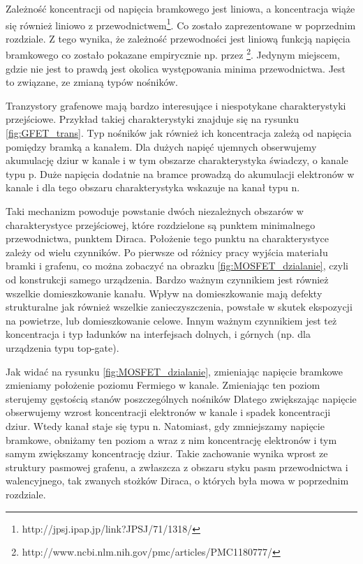 	
	Zależność koncentracji od napięcia bramkowego jest liniowa, a koncentracja wiąże się również liniowo z 
	przewodnictwem\footnote{http://jpsj.ipap.jp/link?JPSJ/71/1318/}. Co zostało zaprezentowane w poprzednim rozdziale.
	 Z tego wynika, że zależność przewodności jest liniową funkcją napięcia bramkowego co zostało pokazane empirycznie
	np. przez \footnote{http://www.ncbi.nlm.nih.gov/pmc/articles/PMC1180777/}.
	Jedynym miejscem, gdzie nie jest to prawdą jest okolica występowania minima przewodnictwa. Jest to związane, ze 
	zmianą typów nośników. 

	
	Tranzystory grafenowe mają bardzo interesujące i niespotykane charakterystyki przejściowe. Przykład takiej 
	charakterystyki znajduje się na rysunku \ref{fig:GFET_trans}. Typ nośników jak również ich koncentracja
	zależą od napięcia pomiędzy bramką a kanałem. Dla dużych napięć ujemnych obserwujemy akumulację dziur w kanale
	i w tym obszarze charakterystyka świadczy, o kanale typu p. Duże napięcia dodatnie na bramce prowadzą do akumulacji
	elektronów w kanale i dla tego obszaru charakterystyka wskazuje na kanał typu n.
	
	Taki mechanizm powoduje powstanie dwóch niezależnych obszarów w charakterystyce przejściowej, które rozdzielone są
	punktem minimalnego przewodnictwa, punktem Diraca. Położenie tego punktu na charakterystyce zależy od wielu 
	czynników. Po pierwsze od różnicy pracy wyjścia materiału bramki i grafenu, co można zobaczyć na obrazku 
	\ref{fig:MOSFET_dzialanie}, czyli od konstrukcji samego urządzenia. Bardzo ważnym czynnikiem jest również 
	wszelkie domieszkowanie kanału. Wpływ na domieszkowanie mają defekty strukturalne jak również wszelkie 
	zanieczyszczenia, powstałe w skutek ekspozycji na powietrze, lub domieszkowanie celowe. Innym ważnym czynnikiem 
	jest też koncentracja i typ ładunków na interfejsach dolnych, i górnych (np. dla urządzenia typu top-gate).
	


	Jak widać na rysunku \ref{fig:MOSFET_dzialanie}, zmieniając napięcie bramkowe zmieniamy położenie 
	poziomu Fermiego w kanale. Zmieniając ten poziom sterujemy gęstością stanów poszczególnych nośników 
	Dlatego zwiększając napięcie obserwujemy wzrost koncentracji elektronów w kanale i spadek koncentracji dziur.
	Wtedy kanał staje się typu n. Natomiast, gdy zmniejszamy napięcie bramkowe, obniżamy ten poziom a wraz z nim
	koncentrację elektronów i tym samym zwiększamy koncentrację dziur. Takie zachowanie wynika wprost ze struktury
	pasmowej grafenu, a zwłaszcza z obszaru styku pasm przewodnictwa i walencyjnego, tak zwanych stożków Diraca, 
	o których była mowa w poprzednim rozdziale. 

